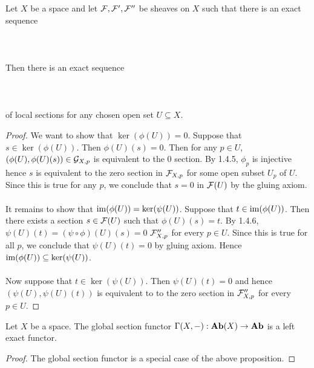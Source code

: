 \documentclass[a4paper]{article}
\begin{document}
\begin{prp}{}{} Let $X$ be a space and let $\mathcal{F},\mathcal{F}',\mathcal{F}''$ be sheaves on $X$ such that there is an exact sequence \\~\\
\\~\\
Then there is an exact sequence \\~\\
\\~\\
of local sections for any chosen open set $U\subseteq X$. \tcbline
\begin{proof}
We want to show that $\ker(\phi(U))=0$. Suppose that $s\in\ker(\phi(U))$. Then $\phi(U)(s)=0$. Then for any $p\in U$, $(\phi(U),\phi(U)(s))\in\mathcal{G}_{X,p}$ is equivalent to the $0$ section. By 1.4.5, $\phi_p$ is injective hence $s$ is equivalent to the zero section in $\mathcal{F}_{X,p}$ for some open subset $U_p$ of $U$. Since this is true for any $p$, we conclude that $s=0$ in $\mathcal{F}(U)$ by the gluing axiom. \\~\\

It remains to show that $\operatorname{im}(\phi(U))=\ker(\psi(U))$. Suppose that $t\in\operatorname{im}(\phi(U))$. Then there exists a section $s\in\mathcal{F}(U)$ such that $\phi(U)(s)=t$. By 1.4.6, $\psi(U)(t)=(\psi\circ\phi)(U)(s)=0$ $\mathcal{F}_{X,p}''$ for every $p\in U$. Since this is true for all $p$, we conclude that $\psi(U)(t)=0$ by gluing axiom. Hence $\operatorname{im}(\phi(U))\subseteq\ker(\psi(U))$. \\~\\

Now suppose that $t\in\ker(\psi(U))$. Then $\psi(U)(t)=0$ and hence $(\psi(U),\psi(U)(t))$ is equivalent to to the zero section in $\mathcal{F}_{X,p}''$ for every $p\in U$. 
\end{proof}
\end{prp}

\begin{crl}{}{} Let $X$ be a space. The global section functor $\Gamma(X,-):\bold{Ab}(X)\to\bold{Ab}$ is a left exact functor. \tcbline
\begin{proof}
The global section functor is a special case of the above proposition. 
\end{proof}
\end{crl}
\end{document}
